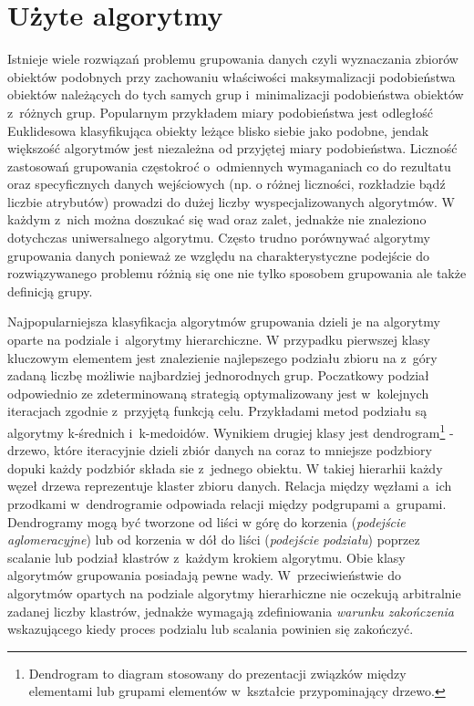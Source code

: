 \chapter{Użyte algorytmy}

Istnieje wiele rozwiązań problemu grupowania danych czyli wyznaczania zbiorów obiektów podobnych przy zachowaniu właściwości maksymalizacji podobieństwa obiektów należących do tych samych grup i~minimalizacji podobieństwa obiektów z~różnych grup. Popularnym przykładem miary podobieństwa jest odległość Euklidesowa klasyfikująca obiekty leżące blisko siebie jako podobne, jendak większość algorytmów jest niezależna od przyjętej miary podobieństwa. Liczność zastosowań grupowania częstokroć o~odmiennych wymaganiach co do rezultatu oraz specyficznych danych wejściowych (np. o różnej liczności, rozkładzie bądź liczbie atrybutów) prowadzi do dużej liczby wyspecjalizowanych algorytmów. W każdym z~nich można doszukać się wad oraz zalet, jednakże nie znaleziono dotychczas uniwersalnego algorytmu. Często trudno porównywać algorytmy grupowania danych ponieważ ze względu na charakterystyczne podejście do rozwiązywanego problemu różnią się one nie tylko sposobem grupowania ale także definicją grupy.

Najpopularniejsza klasyfikacja algorytmów grupowania dzieli je na algorytmy oparte na podziale i~algorytmy hierarchiczne. W przypadku pierwszej klasy kluczowym elementem jest znalezienie najlepszego podziału zbioru na z~góry zadaną liczbę możliwie najbardziej jednorodnych grup. Poczatkowy podział odpowiednio ze zdeterminowaną strategią optymalizowany jest w~kolejnych iteracjach zgodnie z~przyjętą funkcją celu. Przykładami metod podziału są algorytmy k-średnich i~k-medoidów. Wynikiem drugiej klasy jest dendrogram\footnote{Dendrogram to diagram stosowany do prezentacji związków między elementami lub grupami elementów w~kształcie przypominający drzewo.} - drzewo, które iteracyjnie dzieli zbiór danych na coraz to mniejsze podzbiory dopuki każdy podzbiór składa sie z~jednego obiektu. W takiej hierarhii każdy węzeł drzewa reprezentuje klaster zbioru danych. Relacja między węzłami a~ich przodkami w~dendrogramie odpowiada relacji między podgrupami a~grupami. Dendrogramy mogą być tworzone od liści w górę do korzenia (\emph{podejście aglomeracyjne}) lub od korzenia w dół do liści (\emph{podejście podziału}) poprzez scalanie lub podział klastrów z~każdym krokiem algorytmu. Obie klasy algorytmów grupowania posiadają pewne wady. W~przeciwieństwie do algorytmów opartych na podziale algorytmy hierarhiczne nie oczekują arbitralnie zadanej liczby klastrów, jednakże wymagają zdefiniowania \emph{warunku zakończenia} wskazującego kiedy proces podzialu lub scalania powinien się zakończyć.

